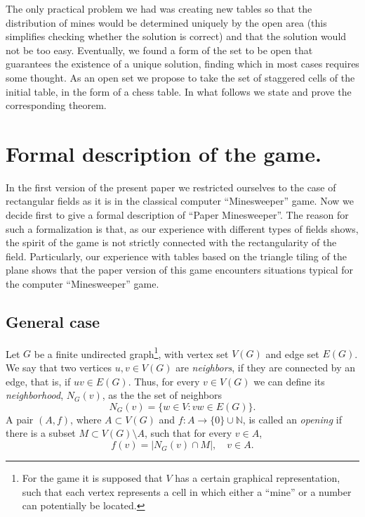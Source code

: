 \documentclass[english,12pt]{article}
\theoremstyle{remark}
\theoremstyle{definition}
\theoremstyle{definition}
\begin{document}
The only practical problem we had was creating new tables so that the distribution of mines would
be determined uniquely by the open area (this simplifies checking whether the solution is correct)
and that the solution would not be too easy. Eventually, we found a form of the set to be open that
guarantees the existence of a unique solution, finding which in most cases requires some thought.
As an open set we propose to take the set of staggered cells of the initial table, in the form of a
chess table. In what follows we state and prove the corresponding theorem.






    \section{Formal description of the game.}
    In the first version of the present paper \cite{first} we
    restricted ourselves to the case of rectangular fields as it is in the
    classical computer ``Minesweeper'' game. Now we decide first
    to give a formal description of ``Paper Minesweeper''. The
    reason for such a formalization is that, as our experience
    with different types of fields shows, the spirit of the game is not strictly
    connected with the rectangularity of the field. Particularly,
    our experience with tables based on the triangle tiling of the plane
    shows that the paper version of this game encounters situations
    typical for the computer ``Minesweeper'' game.

       \subsection{General case}

Let $G$ be a finite undirected graph\footnote{For the game it is
supposed     that $V$ has a certain graphical representation, such
that each     vertex represents a cell in which either a ``mine''
or a number can potentially be located.}, with vertex set $V(G)$
and edge set $E(G)$. We say that two vertices $u,v \in V(G)$ are
\emph{neighbors}, if they are connected by an edge, that is, if
$uv \in E(G)$. Thus, for every $v \in V(G)$ we can define its
\emph{neighborhood}, $N_G(v) $, as the the set of neighbors
$$
N_G(v) = \{w \in V :  vw \in E(G)\}.
$$
A pair $(A,f)$, where $A \subset V(G)$ and $f : A \rightarrow
\{0\} \cup \mathbb N$, is called an \emph{opening} if there is a
subset $M \subset V(G) \setminus A$, such that for every $v \in
A$,
\[
f(v)= |N_G(v) \cap M|, \quad v \in A.
\]
\end{document}
